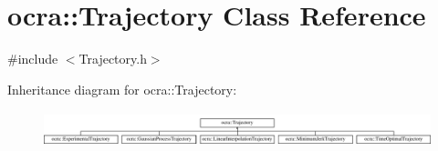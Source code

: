 \hypertarget{classocra_1_1Trajectory}{}\section{ocra\+:\+:Trajectory Class Reference}
\label{classocra_1_1Trajectory}


{\ttfamily \#include $<$Trajectory.\+h$>$}

Inheritance diagram for ocra\+:\+:Trajectory\+:\begin{figure}[H]
\begin{center}
\leavevmode
\includegraphics[height=1.041860cm]{d2/d0d/classocra_1_1Trajectory}
\end{center}
\end{figure}
